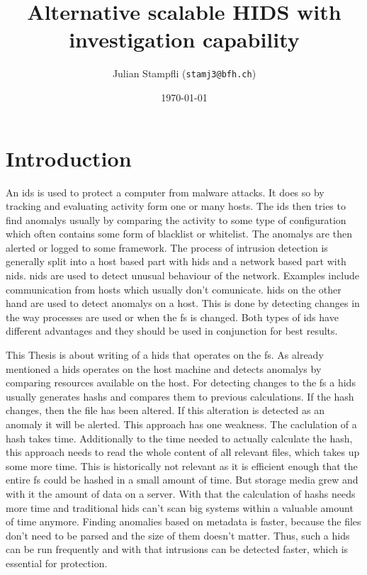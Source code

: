 \documentclass[
	a4paper,					%
	10pt,							%
	twoside,					%
	openright,				%
	notitlepage,			%
	parskip=half,			%
]{scrreprt}					%
\begin{document}
\title{Alternative scalable HIDS with investigation capability}
\date{\today} 
\author{ Julian Stampfli (\texttt{stamj3@bfh.ch}) }
\maketitle
\setcounter{tocdepth}{2}
\tableofcontents
\clearpage

\chapter{Introduction}

An \gls{ids} is used to protect a computer from \gls{malware} attacks. It does so by tracking and evaluating activity form one or many hosts. The \gls{ids} then tries to find \glspl{anomaly} usually by comparing the activity to some type of configuration which often contains some form of blacklist or whitelist. The \glspl{anomaly} are then alerted or logged to some framework. The process of intrusion detection is generally split into a host based part with \gls{hids} and a network based part with \gls{nids}. \gls{nids} are used to detect unusual behaviour of the network. Examples include communication from hosts which usually don't comunicate. \gls{hids} on the other hand are used to detect \glspl{anomaly} on a host. This is done by detecting changes in the way processes are used or when the \gls{fs} is changed. Both types of \gls{ids} have different advantages and they should be used in conjunction for best results. \cite{needed}

This Thesis is about writing of a \gls{hids} that operates on the \gls{fs}. As already mentioned a \gls{hids} operates on the host machine and detects \glspl{anomaly} by comparing resources available on the host. For detecting changes to the \gls{fs} a \gls{hids} usually generates \glspl{hash} and compares them to previous calculations. If the \gls{hash} changes, then the file has been altered. If this alteration is detected as an \gls{anomaly} it will be alerted. This approach has one weakness. The caclulation of a \gls{hash} takes time. Additionally to the time needed to actually calculate the hash, this approach needs to read the whole content of all relevant files, which takes up some more time. \cite{hash:slow} This is historically not relevant as it is efficient enough that the entire \gls{fs} could be hashed in a small amount of time. But storage media grew and with it the amount of data on a server. \cite{bruce:imaging} With that the calculation of \glspl{hash} needs more time and traditional \gls{hids} can't scan big systems within a valuable amount of time anymore. Finding anomalies based on \gls{metadata} is faster, because the files don't need to be parsed and the size of them doesn't matter. Thus, such a \gls{hids} can be run frequently and with that \glspl{intrusion} can be detected faster, which is essential for protection. \cite{inode}
\end{document}

